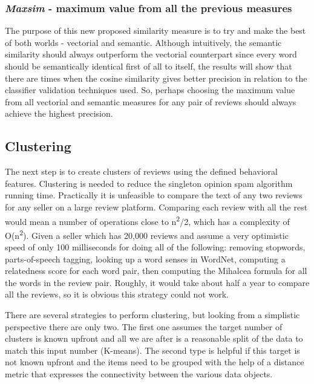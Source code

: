 \subsubsection{\textit{Maxsim} - maximum value from all the previous measures}

The purpose of this new proposed similarity measure is to try and make the best of both worlds - vectorial and semantic. Although intuitively, the semantic similarity should always outperform the vectorial counterpart since every word should be semantically identical first of all to itself, the results will show that there are times when the cosine similarity gives better precision in relation to the classifier validation techniques used. So, perhaps choosing the maximum value from all vectorial and semantic measures for any pair of reviews should always achieve the highest precision.

\clearpage

\subsection{Clustering}\label{subsection:clustering}
The next step is to create clusters of reviews using the defined behavioral features. Clustering is needed to reduce the singleton opinion spam algorithm running time. Practically it is unfeasible to compare the text of any two reviews for any seller on a large review platform. Comparing each review with all the rest would mean a number of operations close to n\textsuperscript{2}/2, which has a complexity of O(n\textsuperscript{2}). Given a seller which has 20,000 reviews and assume a very optimistic speed of only 100 milliseconds for doing all of the following: removing stopwords, parts-of-speech tagging, looking up a word senses in WordNet, computing a relatedness score for each word pair, then computing the Mihalcea formula for all the words in the review pair. Roughly, it would take about half a year to compare all the reviews, so it is obvious this strategy could not work.

There are several strategies to perform clustering, but looking from a simplistic perspective there are only two. The first one assumes the target number of clusters is known upfront and all we are after is a reasonable split of the data to match this input number (K-means). The second type is helpful if this target is not known upfront and the items need to be grouped with the help of a distance metric that expresses the connectivity between the various data objects.

